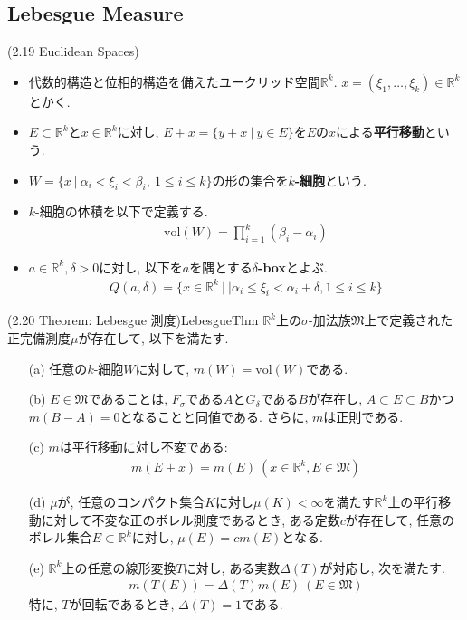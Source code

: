 \documentclass[a4paper]{jsarticle}
\begin{document}
\subsection{Lebesgue Measure}

\begin{defi}{(2.19 Euclidean Spaces)}{}
    \begin{itemize}
        \item 代数的構造と位相的構造を備えたユークリッド空間$\mathbb{R}^k$. $x=(\xi_1, \dots, \xi_k)\in \mathbb{R}^k$とかく.
        \item $E\subset \mathbb{R}^k$と$x\in \mathbb{R}^k$に対し, $E+x=\{y+x \ | \ y\in E \}$を$E$の$x$による{\bf 平行移動}という.
        \item $W=\{x \ | \ \alpha_i < \xi_i<\beta_i, \ 1\leq i\leq k \}$の形の集合を{\bf $k$-細胞}という.
        \item $k$-細胞の体積を以下で定義する.
        \begin{align*}
            \text{vol}(W) = \prod_{i=1}^k (\beta_i-\alpha_i)
        \end{align*}
        \item $a\in \mathbb{R}^k, \delta >0$に対し, 以下を$a$を隅とする{\bf $\delta$-box}とよぶ.
        \begin{align*}
            Q(a, \delta) = \{ x\in \mathbb{R}^k \ | \ | \alpha_i \leq \xi_i < \alpha_i+\delta, 1\leq i\leq k \}
        \end{align*}
    \end{itemize}
\end{defi}
\begin{thm}{(2.20 Theorem: Lebesgue 測度)}{LebesgueThm}
    $\mathbb{R}^k$上の$\sigma$-加法族$\mathfrak{M}$上で定義された正完備測度$\mu$が存在して, 以下を満たす.
    \begin{enumerate}
        \item[(a)] 任意の$k$-細胞$W$に対して, $m(W) = \mathrm{vol}(W)$である.
        \item[(b)] $E\in \mathfrak{M}$であることは, $F_\sigma$である$A$と$G_\delta$である$B$が存在し, $A\subset E\subset B$かつ$m(B-A)=0$となることと同値である. さらに, $m$は正則である.
        \item[(c)] $m$は平行移動に対し不変である:
        \begin{align*}
            m(E+x) = m(E) \ (x\in \mathbb{R}^k, E\in \mathfrak{M})
        \end{align*}
        \item[(d)] $\mu$が, 任意のコンパクト集合$K$に対し$\mu(K)<\infty$を満たす$\mathbb{R}^k$上の平行移動に対して不変な正のボレル測度であるとき, ある定数$c$が存在して, 任意のボレル集合$E\subset \mathbb{R}^k$に対し, $\mu(E)=cm(E)$となる.
        \item[(e)] $\mathbb{R}^k$上の任意の線形変換$T$に対し, ある実数$\Delta(T)$が対応し, 次を満たす.
        \begin{align*}
            m(T(E))=\Delta(T)m(E) \ (E\in \mathfrak{M})
        \end{align*}
        特に, $T$が回転であるとき, $\Delta(T)=1$である.
    \end{enumerate}
\end{thm}
\end{document}
